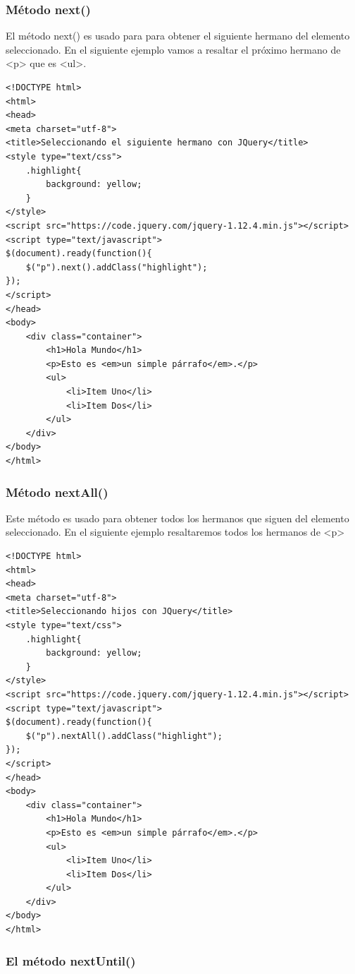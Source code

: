 \documentclass[a4paper, oneside]{article}
\begin{document}
\subsubsection{Método next()}
\label{sec:orgecccec5}

El método next() es usado para para obtener el siguiente hermano del elemento seleccionado. En el siguiente ejemplo vamos a resaltar el próximo hermano de <p> que es <ul>.

\begin{verbatim}
<!DOCTYPE html>
<html>
<head>
<meta charset="utf-8">
<title>Seleccionando el siguiente hermano con JQuery</title>
<style type="text/css">
    .highlight{
        background: yellow;
    }        
</style>
<script src="https://code.jquery.com/jquery-1.12.4.min.js"></script>
<script type="text/javascript">
$(document).ready(function(){
    $("p").next().addClass("highlight");
});
</script>
</head>
<body>
    <div class="container">
        <h1>Hola Mundo</h1>
        <p>Esto es <em>un simple párrafo</em>.</p>
        <ul>
            <li>Item Uno</li>
            <li>Item Dos</li>
        </ul>
    </div>
</body>
</html>                                		
\end{verbatim}

\subsubsection{Método nextAll()}
\label{sec:org0ce5af4}

Este método es usado para obtener todos los hermanos que siguen del elemento seleccionado. En el siguiente ejemplo resaltaremos todos los hermanos de <p>

\begin{verbatim}
<!DOCTYPE html>
<html>
<head>
<meta charset="utf-8">
<title>Seleccionando hijos con JQuery</title>
<style type="text/css">
    .highlight{
        background: yellow;
    }        
</style>
<script src="https://code.jquery.com/jquery-1.12.4.min.js"></script>
<script type="text/javascript">
$(document).ready(function(){
    $("p").nextAll().addClass("highlight");
});
</script>
</head>
<body>
    <div class="container">
        <h1>Hola Mundo</h1>
        <p>Esto es <em>un simple párrafo</em>.</p>
        <ul>
            <li>Item Uno</li>
            <li>Item Dos</li>
        </ul>
    </div>
</body>
</html>                                		
\end{verbatim}

\subsubsection{El método nextUntil()}
\label{sec:orgd017bbd}
\end{document}
